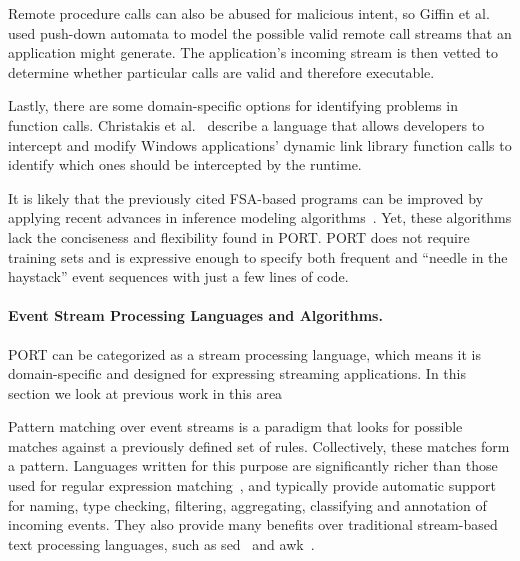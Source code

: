 Remote procedure calls can also be abused for malicious
intent,
so Giffin et al. ~\cite{DBLP:conf/uss/GiffinJM02} used
push-down automata to model the possible valid
remote call streams that an application might generate.
The application's incoming stream
is then vetted
to determine whether particular calls are valid and therefore executable.

Lastly, there are some domain-specific options for
identifying problems
in function calls.
Christakis et al.~\cite{DBLP:conf/icse/ChristakisEG017} describe a language that allows developers to intercept and modify
Windows applications’ dynamic link library function calls to identify which ones should be
intercepted by the runtime.

%
It is likely that the previously cited FSA-based programs can be improved by applying recent advances in inference modeling algorithms~\cite{MarianiPS17,WalkinshawTD13,EmamM18,BeschastnikhBEK14}. Yet, these algorithms lack the conciseness and flexibility found in PORT. PORT does not require training sets and is expressive enough to specify both frequent and  “needle in the haystack” event sequences with just a few lines of code.


\paragraph{Event Stream Processing Languages and Algorithms.}
PORT can be categorized as a stream processing language,
which means it is domain-specific and
designed for expressing streaming applications.
In this section we look at previous work in this area

Pattern matching
over event streams is a paradigm
that looks for
possible matches against a previously defined set of rules. Collectively, these matches form a pattern.
Languages written for this purpose are significantly richer than those used for regular expression
matching~\cite{DBLP:conf/sigmod/AgrawalDGI08},
and typically provide automatic
support for naming, type checking, filtering, aggregating, classifying and
annotation of incoming events. They also  provide many benefits over traditional
stream-based text processing languages, such as sed~\cite{Mcmahon1979sed} and
awk~\cite{DBLP:journals/spe/AhoKW79}.

